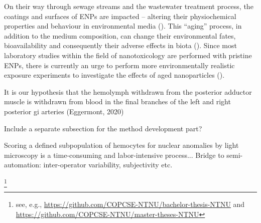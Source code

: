 On their way through sewage streams and the wastewater treatment process, the coatings and surfaces of \acrshort{ENPs} are impacted – altering their physiochemical properties and behaviour in environmental media (\cite{Kaegi2013}). This “aging” process, in addition to the medium composition, can change their environmental fates, bioavailability and consequently their adverse effects in biota (\cite{Metreveli2016, Georgantzopoulou2020}). Since most laboratory studies within the field of nanotoxicology are performed with pristine \acrshort{ENPs}, there is currently an urge to perform more environmentally realistic exposure experiments to investigate the effects of aged nanoparticles (\cite{Metreveli2016}).



It is our hypothesis that the hemolymph withdrawn from the posterior adductor muscle is withdrawn from blood in the final branches of the left and right posterior \acrshort{gi} arteries (Eggermont, 2020)



Include a separate subsection for the method development part?

Scoring a defined subpopulation of hemocytes for nuclear anomalies by light microscopy is a time-consuming and labor-intensive process... Bridge to semi-automation: inter-operator variability, subjectivity etc.




\footnote{see, e.g., 
\url{https://github.com/COPCSE-NTNU/bachelor-thesis-NTNU} and \url{https://github.com/COPCSE-NTNU/master-theses-NTNU}}
